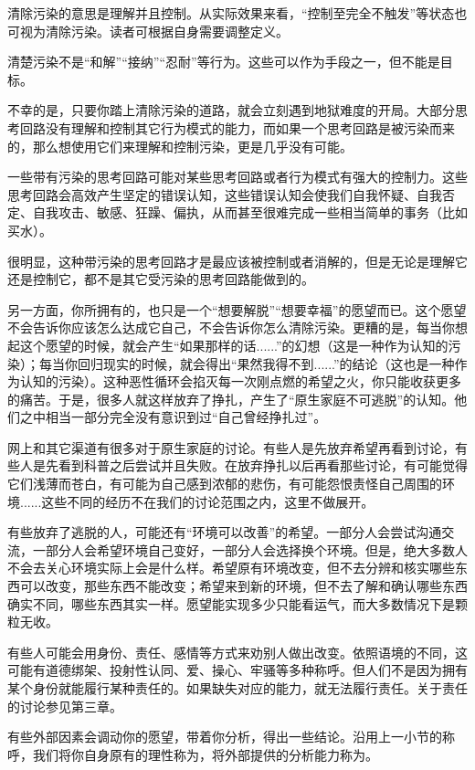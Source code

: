 \begin{explain}
清除污染的意思是理解并且控制。从实际效果来看，“控制至完全不触发”等状态也可视为清除污染。读者可根据自身需要调整定义。

清楚污染不是“和解”“接纳”“忍耐”等行为。这些可以作为手段之一，但不能是目标。
\end{explain}
不幸的是，只要你踏上清除污染的道路，就会立刻遇到地狱难度的开局。大部分思考回路没有理解和控制其它行为模式的能力，而如果一个思考回路是被污染而来的，那么想使用它们来理解和控制污染，更是几乎没有可能。
\begin{explain}
一些带有污染的思考回路可能对某些思考回路或者行为模式有强大的控制力。这些思考回路会高效产生坚定的错误认知，这些错误认知会使我们自我怀疑、自我否定、自我攻击、敏感、狂躁、偏执，从而甚至很难完成一些相当简单的事务（比如买水）。

很明显，这种带污染的思考回路才是最应该被控制或者消解的，但是无论是理解它还是控制它，都不是其它受污染的思考回路能做到的。
\end{explain}
另一方面，你所拥有的，也只是一个“想要解脱”“想要幸福”的愿望而已。这个愿望不会告诉你应该怎么达成它自己，不会告诉你怎么清除污染。更糟的是，每当你想起这个愿望的时候，就会产生“如果那样的话......”的幻想（这是一种作为认知的污染）；每当你回归现实的时候，就会得出“果然我得不到......”的结论（这也是一种作为认知的污染）。这种恶性循环会掐灭每一次刚点燃的希望之火，你只能收获更多的痛苦。于是，很多人就这样放弃了挣扎，产生了“原生家庭不可逃脱”的认知。他们之中相当一部分完全没有意识到过“自己曾经挣扎过”。
\begin{examples}
网上和其它渠道有很多对于原生家庭的讨论。有些人是先放弃希望再看到讨论，有些人是先看到科普之后尝试并且失败。在放弃挣扎以后再看那些讨论，有可能觉得它们浅薄而苍白，有可能为自己感到浓郁的悲伤，有可能怨恨责怪自己周围的环境......这些不同的经历不在我们的讨论范围之内，这里不做展开。
\end{examples}
有些放弃了逃脱的人，可能还有“环境可以改善”的希望。一部分人会尝试沟通交流，一部分人会希望环境自己变好，一部分人会选择换个环境。但是，绝大多数人不会去关心环境实际上会是什么样。希望原有环境改变，但不去分辨和核实哪些东西可以改变，那些东西不能改变；希望来到新的环境，但不去了解和确认哪些东西确实不同，哪些东西其实一样。愿望能实现多少只能看运气，而大多数情况下是颗粒无收。
\begin{examples}
有些人可能会用身份、责任、感情等方式来劝别人做出改变。依照语境的不同，这可能有道德绑架、投射性认同、爱、操心、牢骚等多种称呼。但人们不是因为拥有某个身份就能履行某种责任的。如果缺失对应的能力，就无法履行责任。关于责任的讨论参见第三章。
\end{examples}
有些外部因素会调动你的愿望，带着你分析，得出一些结论。沿用上一小节的称呼，我们将你自身原有的理性称为，将外部提供的分析能力称为。

